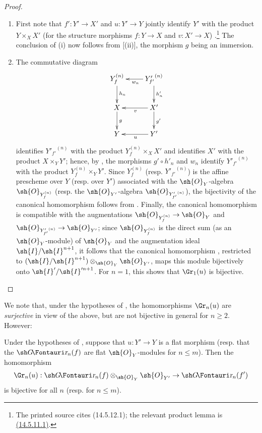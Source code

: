 \begin{proof}
\medskip\noindent
\begin{enumerate}
  \item[(i)] First note that $f':Y'\to X'$ and $u:Y'\to Y$ jointly identify $Y'$ with the product $Y\times_X X'$ (for the structure morphisms $f:Y\to X$ and $v:X'\to X$) .\footnote{The printed source cites (14.5.12.1); the relevant product lemma is {\hyperlink{ega4.c04.lem.14-5-11-1}{(14.5.11.1)}}.}
  The conclusion of (i) now follows from [(ii)], the morphism $g$ being an immersion.
  \item[(ii)] The commutative diagram
  \[
  \xymatrix{
    Y_f^{(n)} \ar[d]^{h_n}  & {Y'_{f'}}^{(n)} \ar[d]^-{h'_n} \ar[l]^{w_n}\\  
    X         \ar[d]^{g}    & X'              \ar[d]^{g'} \ar[l]^v \\  
    Y                       & Y' \ar[l]^u \\  
  }
  \]
  identifies ${Y'_{f'}}^{(n)}$ with the product $Y_f^{(n)}\times_X X'$ and identifies $X'$ with the product $X\times_Y Y'$; hence, by , the morphisms $g'\circ h'_n$ and $w_n$ identify ${Y'_{f'}}^{(n)}$ with the product $Y_f^{(n)}\times_Y Y'$.
  Since $Y_f^{(n)}$ (resp. ${Y'_{f'}}^{(n)}$) is the affine prescheme over $Y$ (resp. over $Y'$) associated with the $\sh{O}_Y$-algebra $\sh{O}_{Y_f^{(n)}}$ (resp. the $\sh{O}_{Y'}$-algebra $\sh{O}_{{Y'_{f'}}^{(n)}}$), the bijectivity of the canonical homomorphism  follows from .
  Finally, the canonical homomorphism  is compatible with the augmentations $\sh{O}_{Y_f^{(n)}} \to \sh{O}_Y$ and $\sh{O}_{{Y'_{f'}}^{(n)}} \to \sh{O}_{Y'}$;
  since $\sh{O}_{Y_f^{(n)}}$ is the direct sum (as an $\sh{O}_Y$-module) of $\sh{O}_Y$ and the augmentation ideal $\sh{I}/\sh{I}^{n+1}$, it follows that the canonical homomorphism , restricted to $(\sh{I}/\sh{I}^{n+1})\otimes_{\sh{O}_Y}\sh{O}_{Y'}$, maps this module bijectively onto $\sh{I}'/\sh{I}'^{n+1}$. For $n=1$, this shows that $\Gr_1(u)$ is bijective.
\end{enumerate}
\end{proof}

We note that, under the hypotheses of , the homomorphisms $\Gr_n(u)$ are \emph{surjective} in view of the above, but are not bijective in general for $n \geq 2$.
However:

\begin{corollary}[16.2.4]
\label{IV.16.2.4}
Under the hypotheses of , suppose that $u: Y' \to Y$ is a flat morphism (resp. that the $\shGr_n(f)$ are flat $\sh{O}_Y$-modules for $n \leq m$).
Then the homomorphism 
\[
  \Gr_n(u):\shGr_n(f) \otimes_{\sh{O}_Y}\sh{O}_{Y'} \to \shGr_n(f')
\]
is bijective for all $n$ (resp. for $n \leq m$).
\end{corollary}

